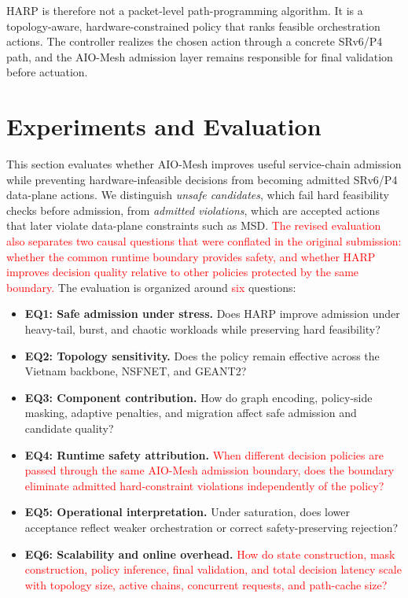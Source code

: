 \documentclass[final,5p]{elsarticle}
\newcommand{\rev}[1]{\textcolor{red}{#1}}
\begin{document}
HARP is therefore not a packet-level path-programming algorithm. It is a topology-aware, hardware-constrained policy that ranks feasible orchestration actions. The controller realizes the chosen action through a concrete SRv6/P4 path, and the AIO-Mesh admission layer remains responsible for final validation before actuation.


\section{Experiments and Evaluation}
\label{sec:evaluation}

This section evaluates whether AIO-Mesh improves useful service-chain admission while preventing hardware-infeasible decisions from becoming admitted SRv6/P4 data-plane actions. We distinguish \textit{unsafe candidates}, which fail hard feasibility checks before admission, from \textit{admitted violations}, which are accepted actions that later violate data-plane constraints such as MSD. \rev{The revised evaluation also separates two causal questions that were conflated in the original submission: whether the common runtime boundary provides safety, and whether HARP improves decision quality relative to other policies protected by the same boundary.} The evaluation is organized around \rev{six} questions:
\begin{itemize}
\item \textbf{EQ1: Safe admission under stress.} Does HARP improve admission under heavy-tail, burst, and chaotic workloads while preserving hard feasibility?
\item \textbf{EQ2: Topology sensitivity.} Does the policy remain effective across the Vietnam backbone, NSFNET, and GEANT2?
\item \textbf{EQ3: Component contribution.} How do graph encoding, policy-side masking, adaptive penalties, and migration affect safe admission and candidate quality?
\item \textbf{EQ4: Runtime safety attribution.} \rev{When different decision policies are passed through the same AIO-Mesh admission boundary, does the boundary eliminate admitted hard-constraint violations independently of the policy?}
\item \textbf{EQ5: Operational interpretation.} Under saturation, does lower acceptance reflect weaker orchestration or correct safety-preserving rejection?
\item \textbf{EQ6: Scalability and online overhead.} \rev{How do state construction, mask construction, policy inference, final validation, and total decision latency scale with topology size, active chains, concurrent requests, and path-cache size?}
\end{itemize}
\end{document}
